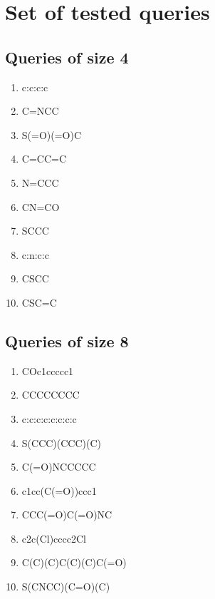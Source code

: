 \documentclass[12pt,a4paper]{report}
\begin{document}
\section*{Set of tested queries} \label{queries}
\subsection*{Queries of size 4}
\begin{enumerate}
	\item c:c:c:c
	\item C=NCC
	\item S(=O)(=O)C
	\item C=CC=C
	\item N=CCC
	\item CN=CO
	\item SCCC
	\item c:n:c:c
	\item CSCC
	\item CSC=C
\end{enumerate}

\subsection*{Queries of size 8}
\begin{enumerate}
	\item COc1ccccc1
	\item CCCCCCCC
	\item c:c:c:c:c:c:c:c
	\item S(CCC)(CCC)(C)
	\item C(=O)NCCCCC
	\item c1cc(C(=O))ccc1
	\item CCC(=O)C(=O)NC
	\item c2c(Cl)cccc2Cl
	\item C(C)(C)C(C)(C)C(=O)
	\item S(CNCC)(C=O)(C)
\end{enumerate}
\end{document}
